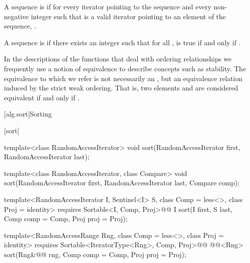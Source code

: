 \pnum
A sequence is
 if for every iterator
pointing to the sequence and every non-negative integer
such that
is a valid iterator pointing to an element of the sequence,
.

\pnum
A sequence
is
if there exists an integer
such that for all
,
is true if and only if
.

\pnum
In the descriptions of the functions that deal with ordering relationships we frequently use a notion of
equivalence to describe concepts such as stability.
The equivalence to which we refer is not necessarily an
,
but an equivalence relation induced by the strict weak ordering.
That is, two elements
and
are considered equivalent if and only if
.

[alg.sort]{Sorting}

[sort]{}

%
\begin{removedblock}
\begin{itemdecl}
template<class RandomAccessIterator>
  void sort(RandomAccessIterator first, RandomAccessIterator last);

template<class RandomAccessIterator, class Compare>
  void sort(RandomAccessIterator first, RandomAccessIterator last,
            Compare comp);
\end{itemdecl}
\end{removedblock}
\begin{addedblock}
\begin{itemdecl}
template<RandomAccessIterator I, Sentinel<I> S, class Comp = less<>,
    class Proj = identity>
  requires Sortable<I, Comp, Proj>@\newtxt{()}@
  I sort(I first, S last, Comp comp = Comp{}, Proj proj = Proj{});

template<RandomAccessRange Rng, class Comp = less<>, class Proj = identity>
  requires Sortable<IteratorType<Rng>, Comp, Proj>@\newtxt{()}@
  @@<Rng>
    sort(Rng&@\newtxt{\&}@ rng, Comp comp = Comp{}, Proj proj = Proj{});
\end{itemdecl}
\end{addedblock}

